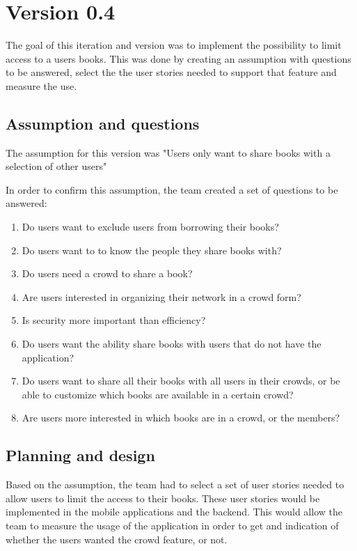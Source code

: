 \section{Version 0.4}
The goal of this iteration and version was to implement the possibility to limit access to a users books. This was done by creating an assumption with questions to be answered, select the the user stories needed to support that feature and measure the use.

\subsection{Assumption and questions}
The assumption for this version was "Users only want to share books with a selection of other users"

In order to confirm this assumption, the team created a set of questions to be answered:

\begin{enumerate}

  \item Do users want to exclude users from borrowing their books?
  \item Do users want to to know the people they share books with?
  \item Do users need a crowd to share a book?
  \item Are users interested in organizing their network in a crowd form?
  \item Is security more important than efficiency?
  \item Do users want the ability share books with users that do not have the application?
  \item Do users want to share all their books with all users in their crowds, or be able to customize which books are available in a certain crowd?
  \item Are users more interested in which books are in a crowd, or the members?
\end{enumerate}


\subsection{Planning and design}

Based on the assumption, the team had to select a set of user stories needed to allow users to limit the access to their books. These user stories would be implemented in the mobile applications and the \gls{backend}. This would allow the team to measure the usage of the application in order to get and indication of whether the users wanted the crowd feature, or not.


